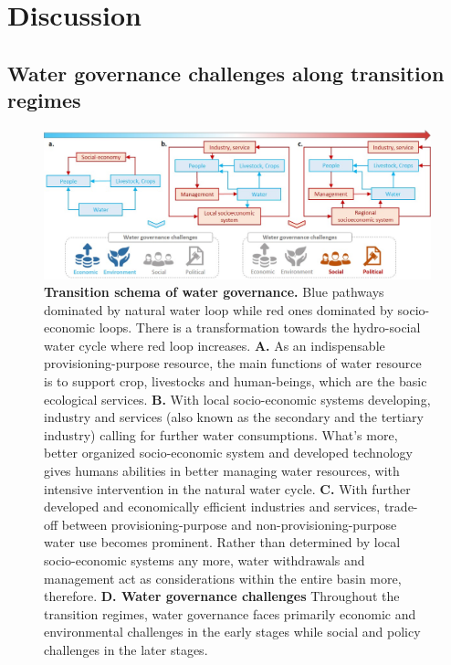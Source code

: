 \documentclass[9pt, twocolumn, twoside, lineno]{pnas-new}
\begin{document}
\section*{Discussion}
\label{Discussion}

\subsection*{Water governance challenges along transition regimes}

\begin{figure}[htbp!]
	\centering
	\includegraphics[width=\linewidth]{../../figures/main/transition.jpg}
	\caption{
		\textbf{Transition schema of water governance.} Blue pathways dominated by natural water loop while red ones dominated by socio-economic loops. There is a transformation towards the hydro-social water cycle where red loop increases.
		\textbf{A.} As an indispensable provisioning-purpose resource, the main functions of water resource is to support crop, livestocks and human-beings, which are the basic ecological services.
		\textbf{B.} With local socio-economic systems developing, industry and services (also known as the secondary and the tertiary industry) calling for further water consumptions. What's more, better organized socio-economic system and developed technology gives humans abilities in better managing water resources, with intensive intervention in the natural water cycle. 
		\textbf{C.} With further developed and economically efficient industries and services, trade-off between provisioning-purpose and non-provisioning-purpose water use becomes prominent. Rather than determined by local socio-economic systems any more, water withdrawals and management act as considerations within the entire basin more, therefore. 
		\textbf{D. Water governance challenges} Throughout the transition regimes, water governance faces primarily economic and environmental challenges in the early stages while social and policy challenges in the later stages.
	}
	\label{fig:summary}
\end{figure}
\end{document}
